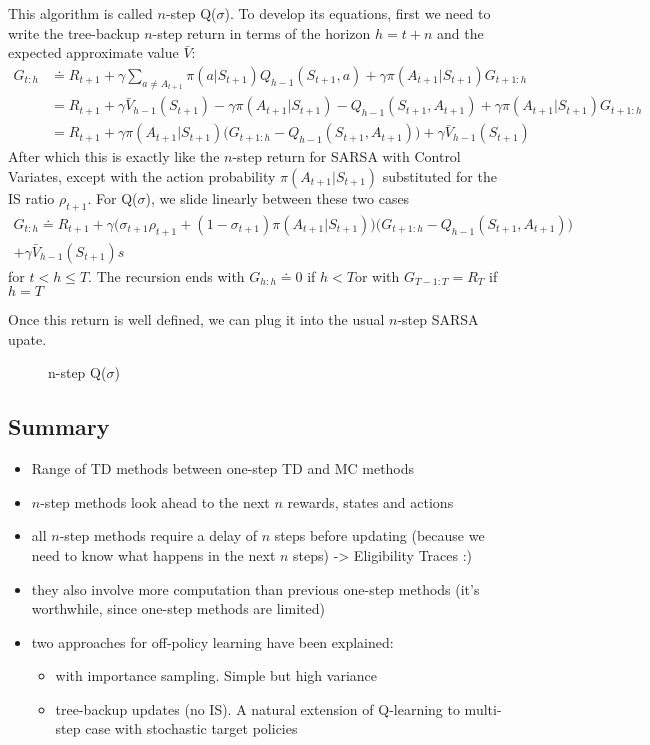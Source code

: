 \documentclass[sutton_barto_notes.tex]{subfiles}
\begin{document}
This algorithm is called $n$-step Q($\sigma$). To develop its equations, first we need to write the tree-backup $n$-step return in terms of the horizon $h = t + n$ and the expected approximate value $\bar{V}$:
\begin{align*}
G_{t:h} & \doteq R_{t+1} + \gamma \sum_{a \neq A_{t+1}} \pi(a| S_{t+1}) Q_{h-1}(S_{t+1}, a) + \gamma \pi(A_{t+1}|S_{t+1}) G_{t+1:h}\\
 & = R_{t+1} + \gamma \bar{V}_{h-1}(S_{t+1}) - \gamma \pi(A_{t+1} | S_{t+1}) - Q_{h-1}(S_{t+1}, A_{t+1}) + \gamma \pi(A_{t+1}|S_{t+1})G_{t+1:h}\\
 & = R_{t+1} + \gamma \pi(A_{t+1} | S_{t+1}) \big( G_{t+1:h} - Q_{h-1}(S_{t+1}, A_{t+1})\big) + \gamma \bar{V}_{h-1}(S_{t+1}) \label{eq:7.17}\tag{7.17}
\end{align*}
After which this is exactly like the $n$-step return for SARSA with Control Variates, except with the action probability $\pi(A_{t+1} | S_{t+1})$ substituted for the IS ratio $\rho_{t+1}$. For Q($\sigma$), we slide linearly between these two cases
\begin{align*}
G_{t:h} \doteq R_{t+1} + \gamma\big(\sigma_{t+1} \rho_{t+1} + (1 - \sigma_{t+1})\pi(A_{t+1}|S_{t+1})\big)\big( G_{t+1:h} - Q_{h-1}(S_{t+1}, A_{t+1})\big) \\+ \gamma \bar{V}_{h-1}(S_{t+1})s
\end{align*}
for $t < h \leq T$. The recursion ends with $G_{h:h} \doteq 0$ if $h < T$or with $G_{T-1:T} = R_T$ if $h = T$

Once this return is well defined, we can plug it into the usual $n$-step SARSA upate.

\begin{figure}[h!]
    \centering
    \caption{ n-step Q($\sigma$) }
\end{figure}

\newpage
\subsection{Summary}

\begin{itemize}
\item Range of TD methods between one-step TD and MC methods
\item $n$-step methods look ahead to the next $n$ rewards, states and actions
\item all $n$-step methods require a delay of $n$ steps before updating (because we need to know what happens in the next $n$ steps) -> Eligibility Traces :)
\item they also involve more computation than previous one-step methods (it's worthwhile, since one-step methods are limited)
\item two approaches for off-policy learning have been explained:
\begin{itemize}
	\item with importance sampling. Simple but high variance
	\item tree-backup updates (no IS). A natural extension of Q-learning to multi-step case with stochastic target policies
\end{itemize}
\end{itemize}
\end{document}

